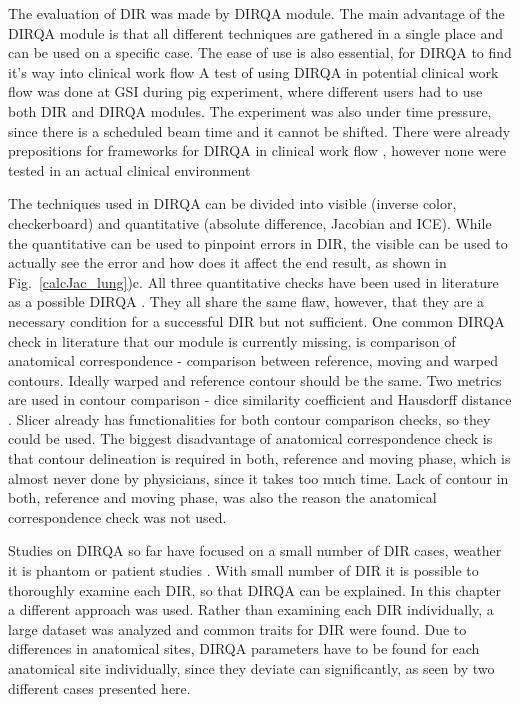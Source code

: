 \documentclass[type=dr, dr=rernat, accentcolor=tud7b,colorbacktitle, bigchapter, openright, twoside, 12pt ]{tudthesis}
\begin{document}
The evaluation of DIR was made by DIRQA module. The main advantage of the DIRQA module is that all different techniques are gathered in a single place and can be used on a specific case. The ease of use is also essential, for DIRQA to find it's way into clinical work flow
A test of using DIRQA in potential clinical work flow was done at GSI during pig experiment, where different users had to use both DIR and DIRQA modules. The experiment was also under time pressure, since there is
a scheduled beam time and it cannot be shifted. There were already prepositions for frameworks for DIRQA in clinical work flow \cite{Varadhan2013}, however none were tested in an actual clinical environment

The techniques used in DIRQA can be divided into visible (inverse color, checkerboard) and quantitative (absolute difference, Jacobian and ICE). While the quantitative can be used to pinpoint errors in DIR, the visible can be used to actually see the error and how does it affect the
end result, as shown in Fig.~\ref{calcJac_lung})c. All three quantitative checks have been used in literature as a possible DIRQA \cite{Varadhan2013, Leow2007, Christensen2001, Bender2009}. They all share the same flaw, however, that they are a necessary condition for a successful
DIR but not sufficient. One common DIRQA check in literature that our module is currently missing, is comparison of anatomical correspondence - comparison between reference, moving and warped contours. Ideally warped and reference contour should be the same. Two metrics are used in contour comparison -
dice similarity coefficient \cite{Varadhan2013} and Hausdorff distance \cite{Huttenlocher1993}. Slicer already has functionalities for both contour comparison checks, so they could be used. The biggest disadvantage of anatomical correspondence check is that contour delineation is required in both, reference and moving phase, which is almost never done by physicians, since it takes too much time. Lack of contour in both, reference and moving phase, was also the reason the anatomical correspondence check was not used.

Studies on DIRQA so far have focused on a small number of DIR cases, weather it is phantom \cite{Mutic2001,Moore2004} or patient studies \cite{Wu2008, Varadhan2013}. With small number of DIR it is possible to thoroughly examine each DIR, so that DIRQA can be explained. In this chapter a different approach was
used. Rather than examining each DIR individually, a large dataset was analyzed and common traits for DIR were found. Due to differences in anatomical sites, DIRQA parameters have to be found for each anatomical site individually, since they
deviate can significantly, as seen by two different cases presented here. 
\end{document}
